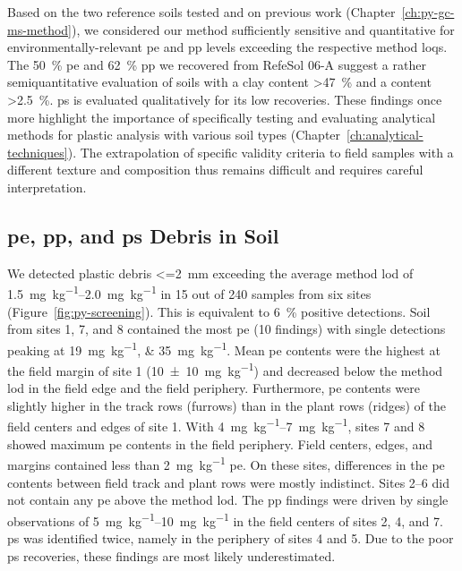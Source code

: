 Based on the two reference soils tested and on previous work (Chapter~\ref{ch:py-gc-ms-method}), we considered our method sufficiently sensitive and quantitative for environmentally-relevant \ac{pe} and \ac{pp} levels exceeding the respective method \acp{loq}. The \SI{50}{\percent} \ac{pe} and \SI{62}{\percent} \ac{pp} we recovered from RefeSol 06-A suggest a rather semiquantitative evaluation of soils with a clay content \SI{>47}{\percent} and a  content \SI{>2.5}{\percent}. \ac{ps} is evaluated qualitatively for its low recoveries.
These findings once more highlight the importance of specifically testing and evaluating analytical methods for plastic analysis with various soil types (Chapter~\ref{ch:analytical-techniques}). The extrapolation of specific validity criteria to field samples with a different texture and  composition thus remains difficult and requires careful interpretation.

\subsection{\ac{pe}, \ac{pp}, and \ac{ps} Debris in Soil}

We detected plastic debris \SI{<=2}{\milli\meter} exceeding the average method \ac{lod} of \SIrange{1.5}{2.0}{\milli\gram\per\kilo\gram} in 15 out of 240 samples from six sites (Figure~\ref{fig:py-screening}). This is equivalent to \SI{6}{\percent} positive detections. Soil from sites 1, 7, and 8 contained the most \ac{pe} (10 findings) with single detections peaking at \SIlist{19;35}{\milli\gram\per\kilo\gram}. Mean \ac{pe} contents were the highest at the field margin of site 1 (\SI{10(10)}{\milli\gram\per\kilo\gram}) and decreased below the method \ac{lod} in the field edge and the field periphery. Furthermore, \ac{pe} contents were slightly higher in the track rows (furrows) than in the plant rows (ridges) of the field centers and edges of site 1. With \SIrange{4}{7}{\milli\gram\per\kilo\gram}, sites 7 and 8 showed maximum \ac{pe} contents in the field periphery. Field centers, edges, and margins contained less than \SI{2}{\milli\gram\per\kilo\gram} \ac{pe}. On these sites, differences in the \ac{pe} contents between field track and plant rows were mostly indistinct. Sites 2--6 did not contain any \ac{pe} above the method \ac{lod}.
The \ac{pp} findings were driven by single observations of \SIrange{5}{10}{\milli\gram\per\kilo\gram} in the field centers of sites 2, 4, and 7.
\ac{ps} was identified twice, namely in the periphery of sites 4 and 5. Due to the poor \ac{ps} recoveries, these findings are most likely underestimated.

